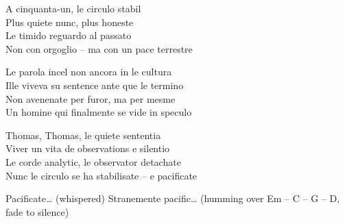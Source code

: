 \begin{lyrics}
A cinquanta-un, le circulo stabil\\
Plus quiete nunc, plus honeste\\
Le timido reguardo al passato\\
Non con orgoglio – ma con un pace terrestre

Le parola incel non ancora in le cultura\\
Ille viveva su sentence ante que le termino\\
Non avenenate per furor, ma per mesme\\
Un homine qui finalmente se vide in speculo

Thomas, Thomas, le quiete sententia\\
Viver un vita de observations e silentio\\
Le corde analytic, le observator detachate\\
Nunc le circulo se ha stabilisate – e pacificate

Pacificate…
(whispered) Stranemente pacific…
(humming over Em – C – G – D, fade to silence)
\end{lyrics}

